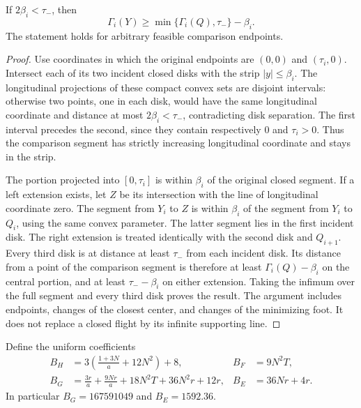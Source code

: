 \begin{lemma}
\label{lem:tb-strip}
If $2\beta_i<\tau_-$, then
\begin{equation}\label{eq:tb-strip}
 \Gamma_i(Y)\ge\min\{\Gamma_i(Q),\tau_-\}-\beta_i.
\end{equation}
The statement holds for arbitrary feasible comparison endpoints.
\end{lemma}
\begin{proof}
Use coordinates in which the original endpoints are $(0,0)$ and
$(\tau_i,0)$.  Intersect each of its two incident closed disks
with the strip $|y|\le\beta_i$.  The longitudinal projections of
these compact convex sets are disjoint intervals: otherwise two
points, one in each disk, would have the same longitudinal coordinate
and distance at most $2\beta_i<\tau_-$, contradicting disk separation.
The first interval precedes the second, since they contain respectively
$0$ and $\tau_i>0$.  Thus the comparison segment has strictly
increasing longitudinal coordinate and stays in the strip.

The portion projected into $[0,\tau_i]$ is within $\beta_i$ of
the original closed segment.  If a left extension exists, let $Z$
be its intersection with the line of longitudinal coordinate zero.
The segment from $Y_i$ to $Z$ is within $\beta_i$ of the segment
from $Y_i$ to $Q_i$, using the same convex parameter.  The latter
segment lies in the first incident disk.  The right extension is
treated identically with the second disk and $Q_{i+1}$.
Every third disk is at distance at least $\tau_-$ from each incident
disk.  Its distance from a point of the comparison segment is
therefore at least $\Gamma_i(Q)-\beta_i$ on the central portion,
and at least $\tau_- -\beta_i$ on either extension.  Taking the
infimum over the full segment and every third disk proves the result.
The argument includes endpoints, changes of the closest center, and
changes of the minimizing foot.  It does not replace a closed flight
by its infinite supporting line.
\end{proof}

Define the uniform coefficients
\begin{align}
 B_H&=3\left(\frac{1+3N}{a}+12N^2\right)+8,
 &B_F&=9N^2T,\label{eq:tb-local-constants}\\
 B_G&=\frac{3r}{a}+\frac{9Nr}{a}+18N^2T+36N^2r+12r,
 &B_E&=36Nr+4r.\label{eq:tb-global-constants}
\end{align}
In particular $B_G=167591049$ and $B_E=1592.36$.

